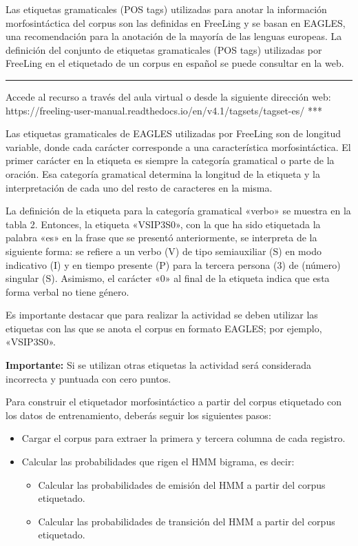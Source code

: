 \documentclass[12pt,a4paper,table]{article}
\providecommand{\tightlist}{%
      \setlength{\itemsep}{0pt}\setlength{\parskip}{0pt}}
\begin{document}
Las etiquetas gramaticales (POS tags) utilizadas para anotar la
información morfosintáctica del corpus son las definidas en FreeLing y
se basan en EAGLES, una recomendación para la anotación de la mayoría de
las lenguas europeas. La definición del conjunto de etiquetas
gramaticales (POS tags) utilizadas por FreeLing en el etiquetado de un
corpus en español se puede consultar en la web.

\begin{center}\rule{0.5\linewidth}{0.5pt}\end{center}

Accede al recurso a través del aula virtual o desde la siguiente
dirección web:
https://freeling-user-manual.readthedocs.io/en/v4.1/tagsets/tagset-es/
***

Las etiquetas gramaticales de EAGLES utilizadas por FreeLing son de
longitud variable, donde cada carácter corresponde a una característica
morfosintáctica. El primer carácter en la etiqueta es siempre la
categoría gramatical o parte de la oración. Esa categoría gramatical
determina la longitud de la etiqueta y la interpretación de cada uno del
resto de caracteres en la misma.

La definición de la etiqueta para la categoría gramatical «verbo» se
muestra en la tabla 2. Entonces, la etiqueta «VSIP3S0», con la que ha
sido etiquetada la palabra «es» en la frase que se presentó
anteriormente, se interpreta de la siguiente forma: se refiere a un
verbo (V) de tipo semiauxiliar (S) en modo indicativo (I) y en tiempo
presente (P) para la tercera persona (3) de (número) singular (S).
Asimismo, el carácter «0» al final de la etiqueta indica que esta forma
verbal no tiene género.

Es importante destacar que para realizar la actividad se deben utilizar
las etiquetas con las que se anota el corpus en formato EAGLES; por
ejemplo, «VSIP3S0».

\textbf{Importante:} Si se utilizan otras etiquetas la actividad será
considerada incorrecta y puntuada con cero puntos.

Para construir el etiquetador morfosintáctico a partir del corpus
etiquetado con los datos de entrenamiento, deberás seguir los siguientes
pasos:

\begin{itemize}
\tightlist
\item
  Cargar el corpus para extraer la primera y tercera columna de cada
  registro.
\item
  Calcular las probabilidades que rigen el HMM bigrama, es decir:

  \begin{itemize}
  \tightlist
  \item
    Calcular las probabilidades de emisión del HMM a partir del corpus
    etiquetado.
  \item
    Calcular las probabilidades de transición del HMM a partir del
    corpus etiquetado.
  \end{itemize}
\end{itemize}
\end{document}
